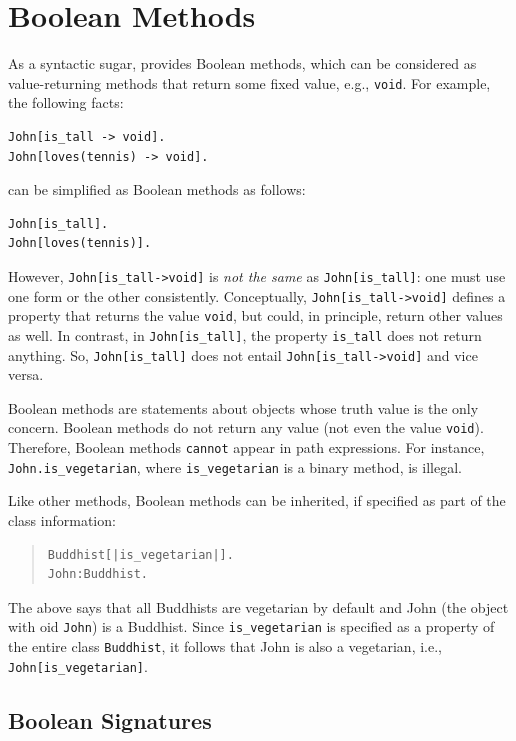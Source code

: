 \documentclass[11pt]{article}
\newcommand{\ERGO}{\mbox{\smaller{\ensuremath{\cal{E}}\smaller{{\sc{RGO}}}}}\xspace}
\newcommand{\FLSYSTEM}{\ERGO}
\begin{document}
\section{Boolean Methods}


As a syntactic sugar, \FLSYSTEM provides Boolean methods, which can be
considered as value-returning methods that return some fixed value, e.g.,
{\tt void}. For example, the following facts:
\begin{verbatim}
John[is_tall -> void].
John[loves(tennis) -> void].
\end{verbatim}
can be simplified as Boolean methods as follows:
\begin{verbatim}
John[is_tall].
John[loves(tennis)].
\end{verbatim}
However, \texttt{John[is\_tall->void]} is \emph{not the same} as
\texttt{John[is\_tall]}: one must use one form or the other consistently.
Conceptually, \texttt{John[is\_tall->void]} defines a property that returns
the value \texttt{void}, but could, in principle, return other values as well.
In contrast, in \texttt{John[is\_tall]},
the property \texttt{is\_tall}  does not return anything.
So, \texttt{John[is\_tall]} does not entail \texttt{John[is\_tall->void]}
and vice versa.

Boolean methods are statements about objects whose truth
value is the only concern. Boolean methods do not return any value (not
even the value {\tt void}). Therefore, Boolean methods {\tt cannot} appear
in path expressions. For instance, \mbox{\tt John.is\_vegetarian}, where
{\tt is\_vegetarian} is a binary method, is illegal.

Like other methods, Boolean methods can be inherited, if specified as part
of the class information:
\begin{quote}
\begin{verbatim}
Buddhist[|is_vegetarian|].
John:Buddhist.
\end{verbatim}
\end{quote}
The above says that all Buddhists are vegetarian by default
and John (the object with
oid {\tt John}) is a Buddhist. Since \verb|is_vegetarian| is specified as a
property of the entire class \texttt{Buddhist},
it follows that John is also a vegetarian, i.e.,
\verb|John[is_vegetarian]|.

\subsection{Boolean Signatures}
\end{document}
